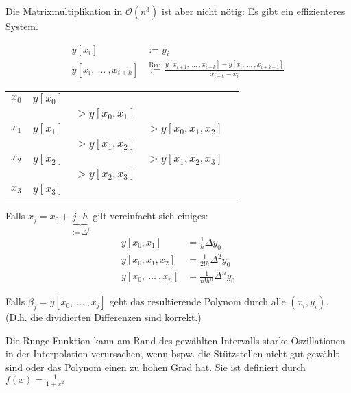 Die Matrixmultiplikation in $\mathcal{O}(n^3)$ ist aber nicht nötig: Es gibt ein effizienteres System. 

\begin{multicols}{2}
    \begin{align*}
        y[x_i] &:= y_i \\
        y[x_i,\ \ldots\ ,x_{i+k}] &\overset{\text{Rec.}}{:=} \frac{y[x_{i+1},\ \ldots\ , x_{i+k}] - y[x_i,\ \ldots\ , x_{i+k-1}]}{x_{i+k}-x_i}
    \end{align*}

    \newcolumn

    \begin{center}
    \begin{tabular}{l|llll}
        $x_0$ & $y[x_0]$ \\
            &          & $>y[x_0,x_1]$        \\
        $x_1$ & $y[x_1]$ &  & $>y[x_0,x_1,x_2]$ \\ 
            &          & $>y[x_1,x_2]$        \\
        $x_2$ & $y[x_2]$ &  & $>y[x_1,x_2,x_3]$ \\
            &          & $>y[x_2,x_3]$        \\
        $x_3$ & $y[x_3]$                        \\
    \end{tabular}
    \end{center}
\end{multicols}


Falls $x_j = x_0 + \underbrace{j \cdot h}_{:= \Delta^j}$ gilt vereinfacht sich einiges:
\begin{align*}
    y[x_0,x_1] &= \frac{1}{h}\Delta y_0 \\
    y[x_0,x_1,x_2] &= \frac{1}{2!h} \Delta^2 y_0 \\
    y[x_0,\ \ldots\ , x_n] &= \frac{1}{n! h^n} \Delta^n y_0 
\end{align*}

 Falls $\beta_j = y[x_0,\ \ldots\ , x_j]$ geht das resultierende Polynom durch alle $(x_i,y_i)$.\\
\footnotesize
(D.h. die dividierten Differenzen sind korrekt.)
\normalsize

 Die Runge-Funktion kann am Rand des gewählten Intervalls starke Oszillationen in der Interpolation verursachen, 
wenn bspw. die Stützstellen nicht gut gewählt sind oder das Polynom einen zu hohen Grad hat.
Sie ist definiert durch $\displaystyle f(x) = \frac{1}{1 + x^2}$


